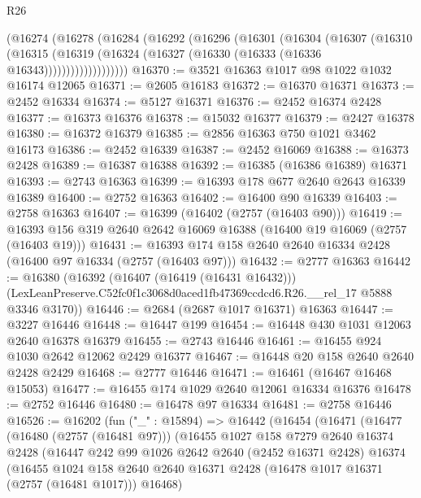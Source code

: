 \begin{lexlean}{R26}
\begin{coremodule}
          (@16274
            (@16278
              (@16284
                (@16292
                  (@16296
                    (@16301
                      (@16304
                        (@16307
                          (@16310
                            (@16315
                              (@16319
                                (@16324 (@16327 (@16330 (@16333 (@16336 @16343)))))))))))))))))))
@16370 := @3521 @16363 @1017 @98 @1022 @1032 @16174 @12065
@16371 := @2605 @16183
@16372 := @16370 @16371
@16373 := @2452 @16334
@16374 := @5127 @16371
@16376 := @2452 @16374 @2428
@16377 := @16373 @16376
@16378 := @15032 @16377
@16379 := @2427 @16378
@16380 := @16372 @16379
@16385 := @2856 @16363 @750 @1021 @3462 @16173
@16386 := @2452 @16339
@16387 := @2452 @16069
@16388 := @16373 @2428
@16389 := @16387 @16388
@16392 := @16385 (@16386 @16389) @16371
@16393 := @2743 @16363
@16399 := @16393 @178 @677 @2640 @2643 @16339 @16389
@16400 := @2752 @16363
@16402 := @16400 @90 @16339
@16403 := @2758 @16363
@16407 := @16399 (@16402 (@2757 (@16403 @90)))
@16419 := @16393 @156 @319 @2640 @2642 @16069 @16388 (@16400 @19 @16069 (@2757 (@16403 @19)))
@16431 := @16393 @174 @158 @2640 @2640 @16334 @2428 (@16400 @97 @16334 (@2757 (@16403 @97)))
@16432 := @2777 @16363
@16442 := @16380
    (@16392
      (@16407 (@16419 (@16431 @16432)))
      (LexLeanPreserve.C52fc0f1c3068d0aced1fb47369ccdcd6.R26.__rel_17 @5888 @3346 @3170))
@16446 := @2684 (@2687 @1017 @16371) @16363
@16447 := @3227 @16446
@16448 := @16447 @199
@16454 := @16448 @430 @1031 @12063 @2640 @16378 @16379
@16455 := @2743 @16446
@16461 := @16455 @924 @1030 @2642 @12062 @2429 @16377
@16467 := @16448 @20 @158 @2640 @2640 @2428 @2429
@16468 := @2777 @16446
@16471 := @16461 (@16467 @16468 @15053)
@16477 := @16455 @174 @1029 @2640 @12061 @16334 @16376
@16478 := @2752 @16446
@16480 := @16478 @97 @16334
@16481 := @2758 @16446
@16526 := @16202
    (fun ("_" : @15894) =>
    @16442
      (@16454
        (@16471
          (@16477
            (@16480 (@2757 (@16481 @97)))
            (@16455
              @1027
              @158
              @7279
              @2640
              @16374
              @2428
              (@16447
                @242
                @99
                @1026
                @2642
                @2640
                (@2452 @16371 @2428)
                @16374
                (@16455
                  @1024
                  @158
                  @2640
                  @2640
                  @16371
                  @2428
                  (@16478 @1017 @16371 (@2757 (@16481 @1017)))
                  @16468)

\end{coremodule}
\end{lexlean}
